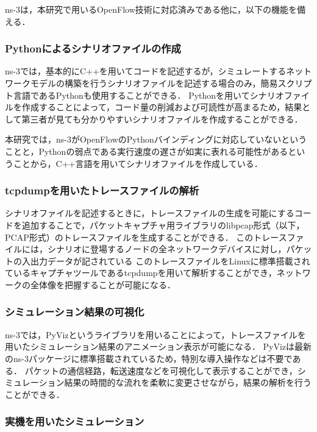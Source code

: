 ns-3は，本研究で用いるOpenFlow技術に対応済みである他に，以下の機能を備える．

\subsubsection{Pythonによるシナリオファイルの作成}

ns-3では，基本的にC++を用いてコードを記述するが，シミュレートするネットワークモデルの構築を行うシナリオファイルを記述する場合のみ，簡易スクリプト言語であるPythonも使用することができる．
Pythonを用いてシナリオファイルを作成することによって，コード量の削減および可読性が高まるため，結果として第三者が見ても分かりやすいシナリオファイルを作成することができる．

本研究では，ns-3がOpenFlowのPythonバインディングに対応していないということと，Pythonの弱点である実行速度の遅さが如実に表れる可能性があるということから，C++言語を用いてシナリオファイルを作成している．

\subsubsection{tcpdumpを用いたトレースファイルの解析}

シナリオファイルを記述するときに，トレースファイルの生成を可能にするコードを追加することで，パケットキャプチャ用ライブラリのlibpcap形式（以下，PCAP形式）のトレースファイルを生成することができる．
このトレースファイルには，シナリオに登場するノードの全ネットワークデバイスに対し，パケットの入出力データが記されている
このトレースファイルをLinuxに標準搭載されているキャプチャツールであるtcpdumpを用いて解析することができ，ネットワークの全体像を把握することが可能になる．

\subsubsection{シミュレーション結果の可視化}

ns-3では，PyVizというライブラリを用いることによって，トレースファイルを用いたシミュレーション結果のアニメーション表示が可能になる．
PyVizは最新のns-3パッケージに標準搭載されているため，特別な導入操作などは不要である．
パケットの通信経路，転送速度などを可視化して表示することができ，シミュレーション結果の時間的な流れを柔軟に変更させながら，結果の解析を行うことができる．

\subsubsection{実機を用いたシミュレーション}

